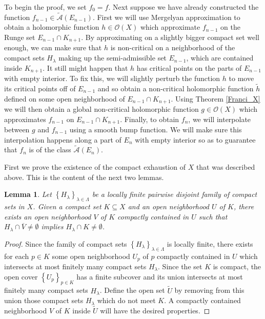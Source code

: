 \documentclass[a4paper,11pt]{amsart}
\newcommand{\set}[1]{\left\{#1\right\}}
\newtheorem{lemma}{Lemma}
\begin{document}
To begin the proof, we set $f_0 = f$.
Next suppose we have already constructed the function $f_{n-1} \in \widetilde{\mathcal{A}}(E_{n-1})$. 
First we will use Mergelyan approximation to obtain a holomorphic function $h \in \mathcal{O}(X)$ which approximate $f_{n-1}$ on the Runge set $E_{n-1} \cap K_{n+1}$.
By approximating on a slightly bigger compact set well enough, we can make sure that $h$ is non-critical on a neighborhood of the compact sets $H_\lambda$ making up the semi-admissible set $E_{n-1}$, which are contained inside $K_{n+1}$.
It still might happen that $h$ has critical points on the parts of $E_{n-1}$ with empty interior. 
To fix this, we will slightly perturb the function $h$ to move its critical points off of $E_{n-1}$ and so obtain a non-critical holomorphic function $\tilde{h}$ defined on some open neighborhood of $E_{n-1} \cap K_{n+1}$.
Using Theorem \ref{Franci_X} we will then obtain a global non-critical holomorphic function $g \in \mathcal{O}(X)$ which approximates $f_{n-1}$ on $E_{n-1} \cap K_{n+1}$.
Finally, to obtain $f_n$, we will interpolate between $g$ and $f_{n-1}$ using a smooth bump function. 
We will make sure this interpolation happens along a part of $E_n$ with empty interior so as to guarantee that $f_n$ is of the class $\widetilde{\mathcal{A}}(E_n)$.

First we prove the existence of the compact exhaustion of $X$ that was described above. This is the content of the next two lemmas.

\begin{lemma} \label{obstajaV}
    Let $\set{H_\lambda}_{\lambda \in \Lambda}$ be a locally finite pairwise disjoint family of compact sets in $X$.
    Given a compact set $K \subseteq X$ and an open neighborhood $U$ of $K$, there exists an open neighborhood $V$ of $K$ compactly contained in $U$ 
    such that $H_\lambda \cap \overline{V} \neq \emptyset$ implies $H_\lambda \cap K \neq \emptyset$.
\end{lemma}

\begin{proof}
    Since the family of compact sets $\set{H_\lambda}_{\lambda \in \Lambda}$ is locally finite, 
    there exists for each $p \in K$ some open neighborhood $U_p$ of $p$ compactly contained in $U$ which intersects at most finitely many compact sets $H_\lambda$. 
    Since the set $K$ is compact, the open cover $\set{U_p}_{p \in K}$ has a finite subcover and its union intersects at most finitely many compact sets $H_\lambda$.
    Define the open set $\widetilde{U}$ by removing from this union those compact sets $H_\lambda$ which do not meet $K$.
    A compactly contained neighborhood $V$ of $K$ inside $\widetilde{U}$ will have the desired properties. 
\end{proof}
\end{document}
